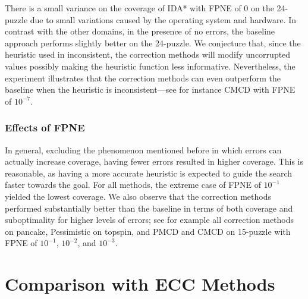 \documentclass[letterpaper]{article}
\newcommand{\roni}[1]{\mbox{\tt RONI: #1}}
\begin{document}
There is a small variance on the coverage of IDA* with FPNE of $0$ on the 24-puzzle due to small variations caused by the operating system and hardware.
In contrast with the other domains, in the presence of no errors, the baseline approach %
performs slightly better on the 24-puzzle. We conjecture that, since the heuristic used in inconsistent, the correction methods will modify uncorrupted values possibly making the heuristic function less informative. Nevertheless, the experiment illustrates that the correction methods can even outperform the baseline when the heuristic is inconsistent---see for instance CMCD with FPNE of $10^{-7}$. 

\subsubsection{Effects of FPNE} 
In general, excluding the phenomenon mentioned before in which errors can actually increase coverage, having fewer errors
resulted in higher coverage. This is reasonable, as having a more accurate heuristic is expected to guide the search faster towards the goal. For all methods, the extreme case of FPNE of $10^{-1}$ yielded the lowest coverage. We also observe that the correction methods performed substantially better than the baseline in terms of both coverage and suboptimality for higher levels of errors; see for example all correction methods on pancake, Pessimistic on topspin, and PMCD and CMCD on 15-puzzle with FPNE of $10^{-1}$, $10^{-2}$, and $10^{-3}$. 

\section{Comparison with ECC Methods}
\end{document}
